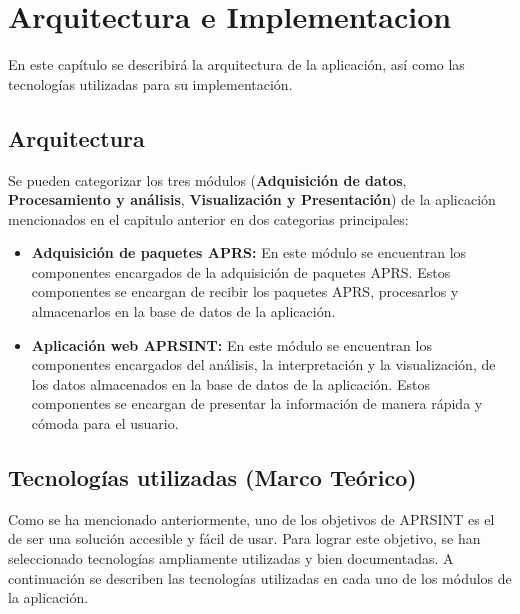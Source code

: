 \titlespacing*{\chapter}{0pt}{-1.25cm}{25pt}
\chapter{Arquitectura e Implementacion}

En este capítulo se describirá la arquitectura de la aplicación, así como las tecnologías utilizadas para su implementación.

\section{Arquitectura}

Se pueden categorizar los tres módulos (\textbf{Adquisición de datos}, \textbf{Procesamiento y análisis}, \textbf{Visualización y Presentación}) de la aplicación mencionados en el capitulo anterior en dos categorias principales:

\begin{itemize}
	\item \textbf{Adquisición de paquetes APRS:} En este módulo se encuentran los componentes encargados de la adquisición de paquetes APRS. Estos componentes se encargan de recibir los paquetes APRS, procesarlos y almacenarlos en la base de datos de la aplicación.

	\item \textbf{Aplicación web APRSINT:} En este módulo se encuentran los componentes encargados del análisis, la interpretación y la visualización, de los datos almacenados en la base de datos de la aplicación. Estos componentes se encargan de presentar la información de manera rápida y cómoda para el usuario.
\end{itemize}

\section{Tecnologías utilizadas (Marco Teórico)}

Como se ha mencionado anteriormente, uno de los objetivos de APRSINT es el de ser una solución accesible y fácil de usar. Para lograr este objetivo, se han seleccionado tecnologías ampliamente utilizadas y bien documentadas. A continuación se describen las tecnologías utilizadas en cada uno de los módulos de la aplicación.
